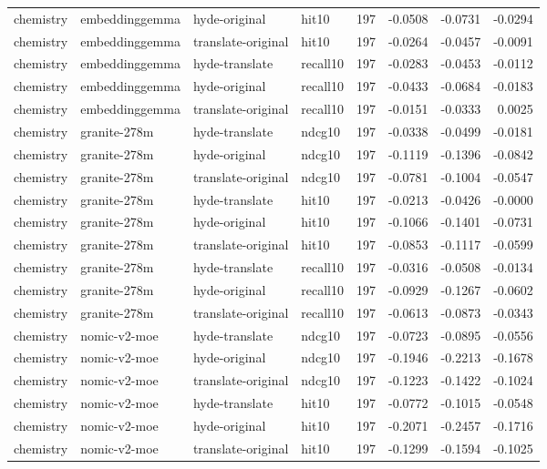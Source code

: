 \begin{tabular}{llllrrrr}
chemistry & embeddinggemma & hyde-original & hit10 & 197 & -0.0508 & -0.0731 & -0.0294 \\
chemistry & embeddinggemma & translate-original & hit10 & 197 & -0.0264 & -0.0457 & -0.0091 \\
chemistry & embeddinggemma & hyde-translate & recall10 & 197 & -0.0283 & -0.0453 & -0.0112 \\
chemistry & embeddinggemma & hyde-original & recall10 & 197 & -0.0433 & -0.0684 & -0.0183 \\
chemistry & embeddinggemma & translate-original & recall10 & 197 & -0.0151 & -0.0333 & 0.0025 \\
chemistry & granite-278m & hyde-translate & ndcg10 & 197 & -0.0338 & -0.0499 & -0.0181 \\
chemistry & granite-278m & hyde-original & ndcg10 & 197 & -0.1119 & -0.1396 & -0.0842 \\
chemistry & granite-278m & translate-original & ndcg10 & 197 & -0.0781 & -0.1004 & -0.0547 \\
chemistry & granite-278m & hyde-translate & hit10 & 197 & -0.0213 & -0.0426 & -0.0000 \\
chemistry & granite-278m & hyde-original & hit10 & 197 & -0.1066 & -0.1401 & -0.0731 \\
chemistry & granite-278m & translate-original & hit10 & 197 & -0.0853 & -0.1117 & -0.0599 \\
chemistry & granite-278m & hyde-translate & recall10 & 197 & -0.0316 & -0.0508 & -0.0134 \\
chemistry & granite-278m & hyde-original & recall10 & 197 & -0.0929 & -0.1267 & -0.0602 \\
chemistry & granite-278m & translate-original & recall10 & 197 & -0.0613 & -0.0873 & -0.0343 \\
chemistry & nomic-v2-moe & hyde-translate & ndcg10 & 197 & -0.0723 & -0.0895 & -0.0556 \\
chemistry & nomic-v2-moe & hyde-original & ndcg10 & 197 & -0.1946 & -0.2213 & -0.1678 \\
chemistry & nomic-v2-moe & translate-original & ndcg10 & 197 & -0.1223 & -0.1422 & -0.1024 \\
chemistry & nomic-v2-moe & hyde-translate & hit10 & 197 & -0.0772 & -0.1015 & -0.0548 \\
chemistry & nomic-v2-moe & hyde-original & hit10 & 197 & -0.2071 & -0.2457 & -0.1716 \\
chemistry & nomic-v2-moe & translate-original & hit10 & 197 & -0.1299 & -0.1594 & -0.1025 \\

\end{tabular}
